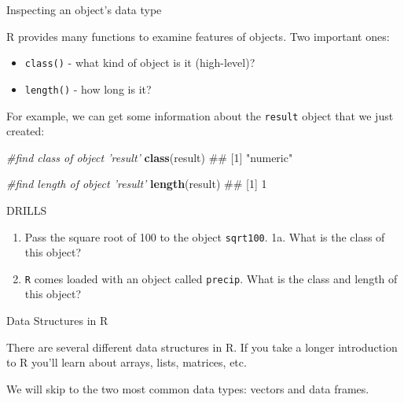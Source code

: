 \documentclass[ignorenonframetext,]{beamer}
\newenvironment{Shaded}{\begin{snugshade}}{\end{snugshade}}
\newcommand{\KeywordTok}[1]{\textcolor[rgb]{0.13,0.29,0.53}{\textbf{#1}}}
\newcommand{\CommentTok}[1]{\textcolor[rgb]{0.56,0.35,0.01}{\textit{#1}}}
\newcommand{\NormalTok}[1]{#1}
\providecommand{\tightlist}{%
  \setlength{\itemsep}{0pt}\setlength{\parskip}{0pt}}
\begin{document}
\begin{frame}[fragile]

\begin{block}{Inspecting an object's data type}

R provides many functions to examine features of objects. Two important
ones:

\begin{itemize}[<+->]
\tightlist
\item
  \texttt{class()} - what kind of object is it (high-level)?
\item
  \texttt{length()} - how long is it?
\end{itemize}

\end{block}

\end{frame}

\begin{frame}[fragile]

For example, we can get some information about the \texttt{result}
object that we just created:

\begin{Shaded}
\begin{Highlighting}[]
\CommentTok{#find class of object 'result'}
\KeywordTok{class}\NormalTok{(result)}
\NormalTok{## [1] "numeric"}

\CommentTok{#find length of object 'result'}
\KeywordTok{length}\NormalTok{(result)}
\NormalTok{## [1] 1}
\end{Highlighting}
\end{Shaded}

\end{frame}

\begin{frame}[fragile]{DRILLS}

\begin{enumerate}[<+->]
\def\labelenumi{\arabic{enumi}.}
\tightlist
\item
  Pass the square root of 100 to the object \texttt{sqrt100}. 1a. What
  is the class of this object?
\item
  \texttt{R} comes loaded with an object called \texttt{precip}. What is
  the class and length of this object?
\end{enumerate}

\end{frame}

\begin{frame}

\begin{block}{Data Structures in R}

There are several different data structures in R. If you take a longer
introduction to R you'll learn about arrays, lists, matrices, etc.

We will skip to the two most common data types: vectors and data frames.

\end{block}

\end{frame}
\end{document}
